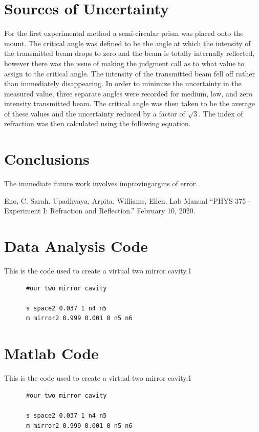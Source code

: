 \documentclass[colorlinks=true,pdfstartview=FitV,linkcolor=blue,
            citecolor=red,urlcolor=magenta]{basedoc}
\begin{document}
\section{Sources of Uncertainty}
  For the first experimental method a semi-circular prism was placed onto the mount. The critical angle was defined to be the angle at which the intensity of the transmitted beam drops to zero and the beam is totally internally reflected, however there was the issue of making the judgment call as to what value to assign to the critical angle. The intensity of the transmitted beam fell off rather than immediately disappearing. In order to minimize the uncertainty in the measured value, three separate angles were recorded for medium, low, and zero intensity transmitted beam. The critical angle was then taken to be the average of these values and the uncertainty reduced by a factor of $\sqrt{3}$. The index of refraction was then calculated using the following equation.

\section{Conclusions}
  The immediate future work involves improvingargins of error.



\begin{thebibliography}{9}

    Eno, C. Sarah. Upadhyaya, Arpita. Williams, Ellen. Lab Manual ``PHYS 375 - Experiment I: Refraction and Reflection.'' February 10, 2020.


\end{thebibliography} %


\appendix \clearpage

\section{Data Analysis Code} \label{appendix:a}

  This is the code used to create a virtual two mirror cavity.1
    \begin{verbatim}
      #our two mirror cavity

      s space2 0.037 1 n4 n5
      m mirror2 0.999 0.001 0 n5 n6
    \end{verbatim}



\section{Matlab Code} \label{appendix:B}

  This is the code used to create a virtual two mirror cavity.1
    \begin{verbatim}
      #our two mirror cavity

      s space2 0.037 1 n4 n5
      m mirror2 0.999 0.001 0 n5 n6
    \end{verbatim}
\end{document}

